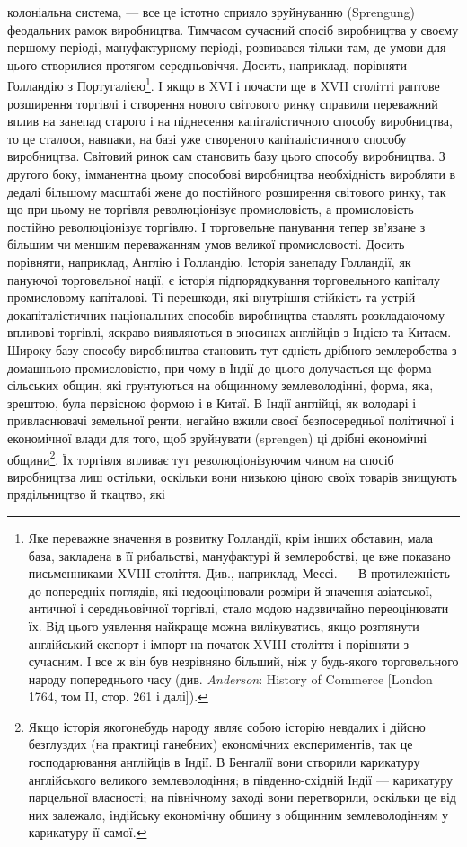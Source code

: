 \parcont{}  %
колоніальна система, — все це істотно сприяло зруйнуванню
(Sprengung) феодальних рамок виробництва. Тимчасом сучасний
спосіб виробництва у своєму першому періоді, мануфактурному
періоді, розвивався тільки там, де умови для цього створилися
протягом середньовіччя. Досить, наприклад, порівняти Голландію
з Португалією\footnote{
Яке переважне значення в розвитку Голландії, крім інших обставин,
мала база, закладена в її рибальстві, мануфактурі й землеробстві, це вже показано
письменниками XVIII століття. Див., наприклад, Мессі. — В протилежність
до попередніх поглядів, які недооцінювали розміри й значення азіатської, античної
і середньовічної торгівлі, стало модою надзвичайно переоцінювати їх.
Від цього уявлення найкраще можна вилікуватись, якщо розглянути англійський
експорт і імпорт на початок XVIII століття і порівняти з сучасним. І все ж
він був незрівняно більший, ніж у будь-якого торговельного народу попереднього
часу (див. \emph{Anderson}: History of Commerce [London 1764, том II, стор. 261
і далі]).
}. І якщо в XVI і почасти ще в XVII столітті
раптове розширення торгівлі і створення нового світового ринку
справили переважний вплив на занепад старого і на піднесення
капіталістичного способу виробництва, то це сталося, навпаки,
на базі уже створеного капіталістичного способу виробництва.
Світовий ринок сам становить базу цього способу виробництва.
З другого боку, імманентна цьому способові виробництва необхідність
виробляти в дедалі більшому масштабі жене до постійного
розширення світового ринку, так що при цьому не торгівля
революціонізує промисловість, а промисловість постійно революціонізує
торгівлю. І торговельне панування тепер зв’язане
з більшим чи меншим переважанням умов великої промисловості.
Досить порівняти, наприклад, Англію і Голландію. Історія занепаду
Голландії, як пануючої торговельної нації, є історія підпорядкування
торговельного капіталу промисловому капіталові.
Ті перешкоди, які внутрішня стійкість та устрій докапіталістичних
національних способів виробництва ставлять розкладаючому
впливові торгівлі, яскраво виявляються в зносинах англійців
з Індією та Китаєм. Широку базу способу виробництва
становить тут єдність дрібного землеробства з домашньою промисловістю,
при чому в Індії до цього долучається ще форма
сільських общин, які грунтуються на общинному землеволодінні,
форма, яка, зрештою, була первісною формою і в Китаї.
В Індії англійці, як володарі і привласнювачі земельної ренти,
негайно вжили своєї безпосередньої політичної і економічної
влади для того, щоб зруйнувати (sprengen) ці дрібні економічні
общини\footnote{
Якщо історія якогонебудь народу являє собою історію невдалих і дійсно
безглуздих (на практиці ганебних) економічних експериментів, так це господарювання
англійців в Індії. В Бенгалії вони створили карикатуру англійського
великого землеволодіння; в південно-східній Індії — карикатуру парцельної
власності; на північному заході вони перетворили, оскільки це від них залежало,
індійську економічну общину з общинним землеволодінням у карикатуру її
самої.
}. Їх торгівля впливає тут революціонізуючим чином
на спосіб виробництва лиш остільки, оскільки вони низькою
ціною своїх товарів знищують прядільництво й ткацтво, які
\parbreak{}  %
